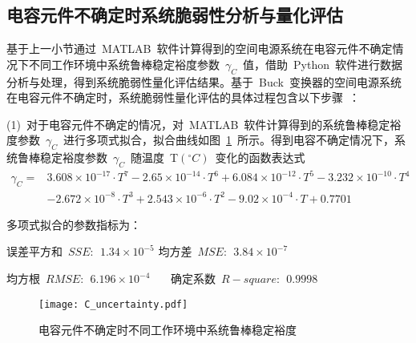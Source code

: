 \subsection{电容元件不确定时系统脆弱性分析与量化评估}
基于上一小节通过~MATLAB~软件计算得到的空间电源系统在电容元件不确定情况下不同工作环境中系统鲁棒稳定裕度参数~$\gamma_C$~值，借助~Python~软件进行数据分析与处理，得到系统脆弱性量化评估结果。基于~Buck~变换器的空间电源系统在电容元件不确定时，系统脆弱性量化评估的具体过程包含以下步骤~：

(1)~对于电容元件不确定的情况，对~MATLAB~软件计算得到的系统鲁棒稳定裕度参数~$\gamma_C$~进行多项式拟合，拟合曲线如图~\ref{fig:chap5:cuncertainty}~所示。得到电容不确定情况下，系统鲁棒稳定裕度参数~$\gamma_C$~随温度~T$\left(^{\circ}C\right)$~变化的函数表达式
\begin{equation}\label{equ:chap5:Index29}
\begin{split}
   \gamma_C= &3.608\times10^{-17}\cdot T^7-2.65\times10^{-14}\cdot T^6+6.084\times10^{-12}\cdot T^5-3.232\times10^{-10}\cdot T^4\\
     & -2.672\times10^{-8}\cdot T^3+2.543\times10^{-6}\cdot T^2-9.02\times10^{-4}\cdot T+0.7701
\end{split}
\end{equation}

多项式拟合的参数指标为：

\qquad 误差平方和~$SSE\colon~~1.34\times10^{-5}$  \qquad 均方差~$MSE\colon~~3.84\times10^{-7} $

\qquad 均方根~$RMSE\colon~~6.196\times10^{-4}$    ~~~\qquad 确定系数~$R-square\colon~~0.9998$

\iffalse
\begin{table}[htbp]
  \centering
\begin{tabular}{p{5cm}p{5cm}}

  误差平方和~$SSE\colon~~1.34\times10^{-5}$     & ~~均方差~$MSE\colon~~3.84\times10^{-7} $\\

  均方根~$RMSE\colon~~6.196\times10^{-4}$     & ~~确定系数~$R-square\colon~~0.9998$ \\
\end{tabular}
\end{table}
\fi

\begin{figure}[h]
  \centering
     \texttt{[image: C\_uncertainty.pdf]}\\
      \medskip
  \caption{电容元件不确定时不同工作环境中系统鲁棒稳定裕度}\label{fig:chap5:cuncertainty}
\end{figure}

